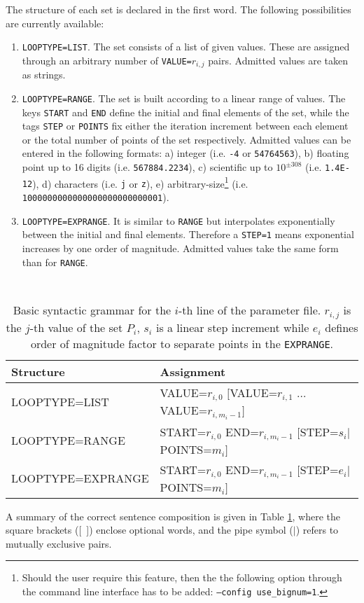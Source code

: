 \documentclass[12pt,a4paper]{article}
\newcommand{\tab}[1]{Table \ref{#1}}
\begin{document}
The structure of each set is declared in the first word. The following possibilities are currently available:
\begin{enumerate}
\item {\tt LOOPTYPE=LIST}. The set consists of a list of given values. These are assigned through an arbitrary number of {\tt VALUE=}$r_{i,j}$ pairs. Admitted values are taken as strings.
\item {\tt LOOPTYPE=RANGE}. The set is built according to a linear range of values. The keys {\tt START} and {\tt END} define the initial and final elements of the set, while the tags {\tt STEP} or {\tt POINTS} fix either the iteration increment between each element or the total number of points of the set respectively. Admitted values can be entered in the following formats:
\subitem a) integer (i.e. {\tt -4} or {\tt 54764563}),
\subitem b) floating point up to 16 digits (i.e. {\tt 567884.2234}),
\subitem c) scientific up to $10^{\pm 308}$ (i.e. {\tt 1.4E-12}),
\subitem d) characters (i.e. {\tt j} or {\tt z}),
\subitem e) arbitrary-size\footnote{Should the user require this feature, then the the following option through the command line interface has to be added: {\tt --config use\_bignum=1}.} (i.e. {\tt 1000000000000000000000000001}).
\item {\tt LOOPTYPE=EXPRANGE}. It is similar to {\tt RANGE} but interpolates exponentially between the initial and final elements. Therefore a {\tt STEP=1} means exponential increases by one order of magnitude. Admitted values take the same form than for {\tt RANGE}.
\end{enumerate}
\begin{table}[!ht]
\center
{\tt
\begin{tabular}{ll}
\hline
\textrm{Structure} & \textrm{Assignment} \\
\hline
LOOPTYPE=LIST & VALUE=$r_{i,0}$ $[$VALUE=$r_{i,1}$ $\ldots$ VALUE=$r_{i,m_i-1}]$\\
LOOPTYPE=RANGE & START=$r_{i,0}$ END=$r_{i,m_i-1}$ $[$STEP=$s_{i}$$\mid$POINTS=$m_i$$]$\\
LOOPTYPE=EXPRANGE & START=$r_{i,0}$ END=$r_{i,m_i-1}$ $[$STEP=$e_{i}$$\mid$POINTS=$m_i$$]$\\
\hline
\end{tabular}
}
\caption{Basic syntactic grammar for the $i$-th line of the parameter file. $r_{i,j}$ is the $j$-th value of the set $P_i$, $s_i$ is a linear step increment while $e_i$ defines order of magnitude factor to separate points in the {\tt EXPRANGE}.}
\label{syntax}
\end{table}
A summary of the correct sentence composition is given in \tab{syntax}, where the square brackets ([~]) enclose optional words, and the pipe symbol ($\mid$) refers to mutually exclusive pairs.
\end{document}
